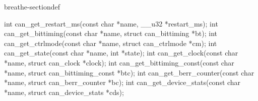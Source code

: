 \documentclass[a4paper,10pt,english]{sphinxmanual}
\begin{document}
\begin{fulllineitems}
\begin{sphinxuseclass}{breathe-sectiondef}
\begin{fulllineitems}
\sphinxAtStartPar
int can\_get\_restart\_ms(const char *name, \_\_u32 *restart\_ms); int can\_get\_bittiming(const char *name, struct can\_bittiming *bt); int can\_get\_ctrlmode(const char *name, struct can\_ctrlmode *cm); int can\_get\_state(const char *name, int *state); int can\_get\_clock(const char *name, struct can\_clock *clock); int can\_get\_bittiming\_const(const char *name, struct can\_bittiming\_const *btc); int can\_get\_berr\_counter(const char *name, struct can\_berr\_counter *bc); int can\_get\_device\_stats(const char *name, struct can\_device\_stats *cds); 

\end{fulllineitems}


\end{sphinxuseclass}
\end{fulllineitems}

\end{document}
